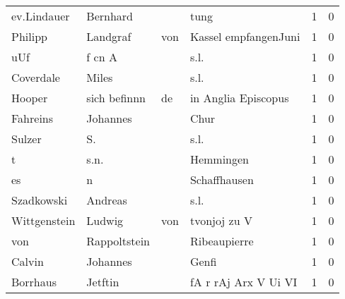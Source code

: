 \begin{center}
\begin{tiny}
\begin{longtabu}{llllrr}
              ev.Lindauer &                           Bernhard &             &                                        tung &          1 &         0 \\
                  Philipp &                           Landgraf &         von &                        Kassel empfangenJuni &          1 &         0 \\
                      uUf &                             f cn A &             &                                        s.l. &          1 &         0 \\
                Coverdale &                              Miles &             &                                        s.l. &          1 &         0 \\
                   Hooper &                       sich befinnn &          de &                         in Anglia Episcopus &          1 &         0 \\
                 Fahreins &                           Johannes &             &                                        Chur &          1 &         0 \\
                   Sulzer &                                 S. &             &                                        s.l. &          1 &         0 \\
                        t &                               s.n. &             &                                   Hemmingen &          1 &         0 \\
                       es &                                  n &             &                                Schaffhausen &          1 &         0 \\
               Szadkowski &                            Andreas &             &                                        s.l. &          1 &         0 \\
             Wittgenstein &                             Ludwig &         von &                                tvonjoj zu V &          1 &         0 \\
                      von &                       Rappoltstein &             &                                Ribeaupierre &          1 &         0 \\
                   Calvin &                           Johannes &             &                                       Genfi &          1 &         0 \\
                 Borrhaus &                            Jetftin &             &                        fA r rAj Arx V Ui VI &          1 &         0 \\

\end{longtabu}
\end{tiny}
\end{center}
